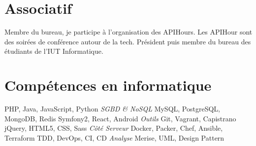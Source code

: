 \documentclass[11pt,a4paper]{moderncv}
\begin{document}
    \section{Associatif}
        {
          Membre du bureau, je participe à l'organisation des APIHours. Les
          APIHour sont \newline{}des soirées de conférence autour de la tech.
        }
        {
          Président puis membre du bureau des étudiants de l'IUT Informatique.
        }

    \section{Compétences en informatique}
         {PHP, Java, JavaScript, Python}
            {\textit{SGBD \& NoSQL}} {MySQL, PostgreSQL, MongoDB, Redis}
         {Symfony2, React, Android }
            {\textit{Outils}} {Git, Vagrant, Capistrano}
         {jQuery, HTML5, CSS, Sass}
            {\textit{Côté Serveur}} {Docker, Packer, Chef, Ansible, Terraform}
         {TDD, DevOps, CI, CD}
            {\textit{Analyse}} {Merise, UML, Design Pattern}
\end{document}
